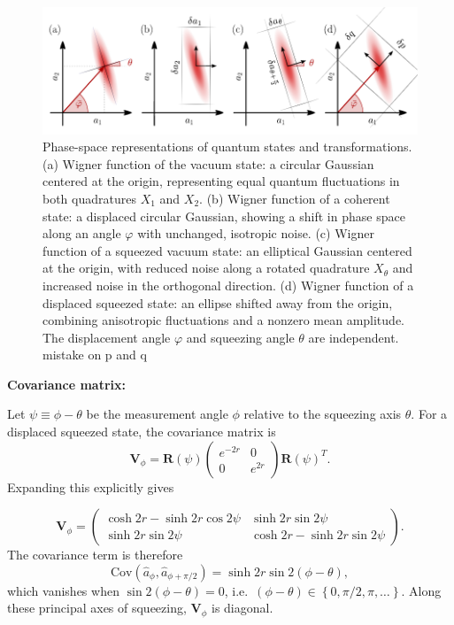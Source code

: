 \begin{figure}
\centering
\includegraphics[width=\textwidth]{./chap2/fig/quantum_quadraturesBis.pdf}
\caption{Phase-space representations of quantum states and transformations.
(a) Wigner function of the vacuum state: a circular Gaussian centered at the origin, representing equal quantum fluctuations in both quadratures $X_1$ and $X_2$.
(b) Wigner function of a coherent state: a displaced circular Gaussian, showing a shift in phase space along an angle $\varphi$ with unchanged, isotropic noise.
(c) Wigner function of a squeezed vacuum state: an elliptical Gaussian centered at the origin, with reduced noise along a rotated quadrature $X_\theta$ and increased noise in the orthogonal direction.
(d) Wigner function of a displaced squeezed state: an ellipse shifted away from the origin, combining anisotropic fluctuations and a nonzero mean amplitude. The displacement angle $\varphi$ and squeezing angle $\theta$ are independent. \color{red} mistake on p and q  \color{black}}
\end{figure}

\noindent \textbf{Covariance matrix: }

Let $\psi \equiv \phi - \theta$ be the measurement angle $\phi$ relative to the squeezing axis $\theta$.  
For a displaced squeezed state, the covariance matrix is
\begin{equation}
\mathbf{V}_\phi = \mathbf R(\psi)
\begin{pmatrix}
e^{-2r} & 0 \\[2pt]
0 & e^{2r}
\end{pmatrix}
\mathbf R(\psi)^{T}.
\label{II.xx4}
\end{equation}
Expanding this explicitly gives

\begin{equation}
\mathbf{V}_\phi =
\begin{pmatrix}
\cosh 2r - \sinh 2r \cos 2\psi
& \sinh 2r \sin 2\psi \\[6pt]
\sinh 2r \sin 2\psi
& \cosh 2r - \sinh 2r \sin 2\psi
\end{pmatrix}.
\end{equation}
The covariance term is therefore
\begin{equation}
\mathrm{Cov}(\hat a_\phi, \hat a_{\phi+\pi/2})
= \sinh 2r \sin 2(\phi-\theta) ,
\label{II.xx6}
\end{equation}
which vanishes when $\sin 2(\phi-\theta) = 0$, i.e.\ $(\phi - \theta) \in \left\{ 0, \pi/2, \pi, \ldots \right\}$.
Along these principal axes of squeezing, $\mathbf{V}_\phi$ is diagonal. \\

